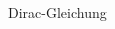 \begin{frame}{Dirac-Gleichung}
\begin{columns}[T]
\begin{column}{.6\textwidth}
{\begin{itemize}
            \end{itemize}}

\end{column}
\end{columns}
\end{frame}
